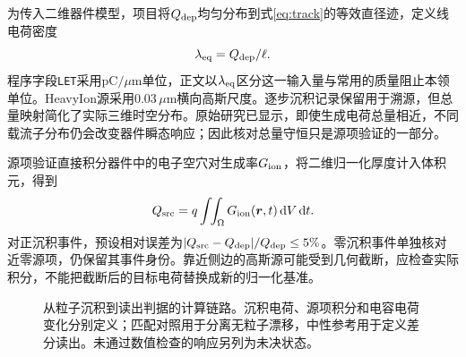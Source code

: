 \documentclass[UTF8,a4paper,zihao=-4,fontset=fandol]{ctexart}
\newcommand{\um}{\,\mu\mathrm{m}}
\begin{document}
为传入二维器件模型，项目将$Q_{\rm dep}$均匀分布到式\eqref{eq:track}的等效直径迹，定义线电荷密度
\begin{equation}
\lambda_{\rm eq}=Q_{\rm dep}/\ell.
\label{eq:lambda}
\end{equation}
程序字段\texttt{LET}采用$\mathrm{pC}/\mu\mathrm{m}$单位，正文以$\lambda_{\rm eq}$区分这一输入量与常用的质量阻止本领单位。HeavyIon源采用$0.03\um$横向高斯尺度。逐步沉积记录保留用于溯源，但总量映射简化了实际三维时空分布。原始研究已显示，即使生成电荷总量相近，不同载流子分布仍会改变器件瞬态响应\cite{ryder2021}；因此核对总量守恒只是源项验证的一部分。

源项验证直接积分器件中的电子空穴对生成率$G_{\rm ion}$，将二维归一化厚度计入体积元，得到
\begin{equation}
Q_{\rm src}=q\int\!\!\int_{\Omega}G_{\rm ion}(\bm r,t)\,\mathrm{d}V\,\mathrm{d}t.
\label{eq:source}
\end{equation}
对正沉积事件，预设相对误差为$|Q_{\rm src}-Q_{\rm dep}|/Q_{\rm dep}\leq5\%$。零沉积事件单独核对近零源项，仍保留其事件身份。靠近侧边的高斯源可能受到几何截断，应检查实际积分，不能把截断后的目标电荷替换成新的归一化基准。

\begin{figure}[htbp]
\centering
{}
\caption{从粒子沉积到读出判据的计算链路。沉积电荷、源项积分和电容电荷变化分别定义；匹配对照用于分离无粒子漂移，中性参考用于定义差分读出。未通过数值检查的响应另列为未决状态。}
\label{fig:chain}
\end{figure}
\end{document}
